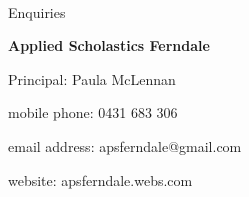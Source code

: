 \documentclass{article}
\begin{document}
\begin{spacing}{1.25}
\newpage
\
\newpage

\doublespacing

\begin{center}

Enquiries

\textbf{Applied Scholastics Ferndale}

Principal: Paula McLennan

mobile phone: 0431 683 306

email address: apsferndale@gmail.com

website: apsferndale.webs.com

\end{center}

\end{spacing}
\end{document}
